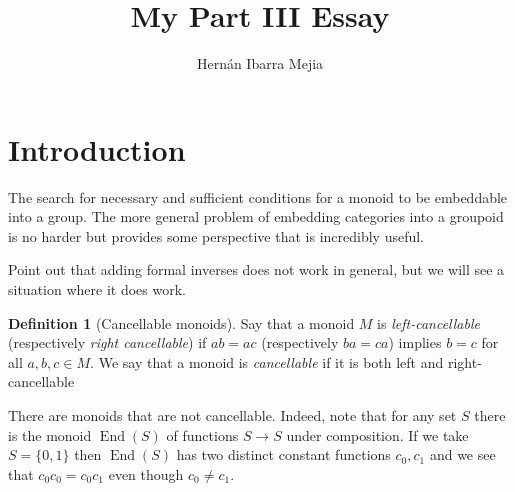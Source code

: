 \documentclass{article}
\theoremstyle{plain}
\theoremstyle{definition}
\newtheorem{defn}[thm]{Definition}
\DeclareMathOperator{\End}{End}
\begin{document}
	\title{My Part III Essay}
	\author{Hernán Ibarra Mejia}
	\maketitle
	\section{Introduction}
	The search for necessary and sufficient conditions for a monoid to be embeddable into a group. The more general problem of embedding categories into a groupoid is no harder but provides some perspective that is incredibly useful.
	
	Point out that adding formal inverses does not work in general, but we will see a situation where it does work.
	\begin{defn}[Cancellable monoids]
		Say that a monoid $M$ is \emph{left-cancellable} (respectively \emph{right cancellable}) if $ab = ac$ (respectively $ba=ca$) implies $b = c$ for all $a,b,c\in M$. We say that a monoid is \emph{cancellable} if it is both left and right-cancellable
	\end{defn}
	There are monoids that are not cancellable. Indeed, note that for any set $S$ there is the monoid $\End(S)$ of functions $S\to S$ under composition. If we take $S= \{0,1\}$ then $\End(S)$ has two distinct constant functions $c_0,c_1$ and we see that $c_0c_0 = c_0c_1$ even though $c_0\neq c_1$.
	
\end{document}
